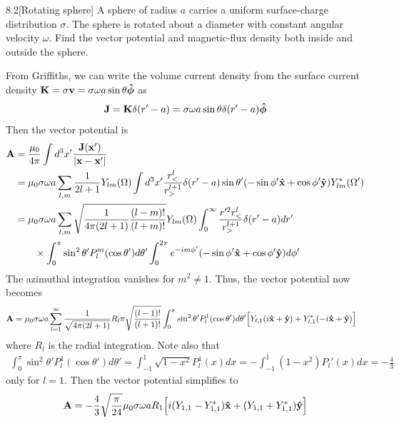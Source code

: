 \documentclass[12pt]{article}
\begin{document}
\begin{problem}{8.2}[Rotating sphere]
A sphere of radius $a$ carries a uniform surface-charge distribution $\sigma$.
The sphere is rotated about a diameter with constant angular velocity $\omega$.
Find the vector potential and magnetic-flux density both inside and outside the
sphere.
\begin{solution}
From Griffiths, we can write the volume current density from the surface current
density $\vb{K}=\sigma\vb{v}=\sigma\omega a\sin\theta\bm{\hat{\phi}}$ as
\begin{equation}
    \vb{J}=\vb{K}\delta(r'-a) 
    =\sigma\omega a\sin\theta\delta(r'-a)\bm{\hat{\phi}}
\end{equation}
Then the vector potential is
\begin{align}
    \vb{A}
    &=\frac{\mu_0}{4\pi}\int
    d^3x'\frac{\vb{J}(\vb{x}')}{\abs{\vb{x}-\vb{x}'}}\notag\\
    &=\mu_0\sigma\omega a\sum_{l,m}\frac1{2l+1}Y_{lm}(\Omega)\int d^3x'
    \frac{r_<^l}{r_>^{l+1}}
    \delta(r'-a)\sin\theta'(-\sin\phi'\vb{\hat{x}}+\cos\phi'\vb{\hat{y}})
    Y_{lm}^\ast(\Omega')\notag\\
    &=\mu_0\sigma\omega
    a\sum_{l,m}\sqrt{\frac{1}{4\pi(2l+1)}\frac{(l-m)!}{(l+m)!}}Y_{lm}(\Omega)
    \int_0^\infty \frac{r'^2r_<^l}{r_>^{l+1}}\delta(r'-a)dr'\notag\\
    &\qquad\times\int_0^\pi\sin^2\theta'P_l^m(\cos\theta')d\theta'
        \int_0^{2\pi}e^{-im\phi'}(-\sin\phi'\vb{\hat{x}}+\cos\phi'\vb{\hat{y}})d\phi'
\end{align}
The azimuthal integration vanishes for $m^2\neq 1$. Thus, the vector potential
now becomes
\begin{align}
    \vb{A}
    &=\mu_0\sigma\omega a\sum_{l=1}^\infty
    \frac{1}{\sqrt{4\pi(2l+1)}}R_l\pi\sqrt{\frac{(l-1)!}{(l+1)!}}
    \int_0^\pi\sin^2\theta'P_l^1(\cos\theta')d\theta'
\qty[Y_{l,1}(i\vb{\hat{x}}+\vb{\hat{y}})+Y_{l,1}^\ast(-i\vb{\hat{x}}+\vb{\hat{y}})]
\end{align}
where $R_l$ is the radial integration. Note also that
\begin{align}
    \int_0^\pi\sin^2\theta'P_l^1(\cos\theta')d\theta'
    =\int_{-1}^1\sqrt{1-x^2}P_l^1(x)dx
    =-\int_{-1}^1(1-x^2)P_l'(x)dx
    =-\frac43
\end{align}
only for $l=1$. Then the vector potential simplifies to
\begin{align}
    \vb{A}
    &=-\frac43\sqrt{\frac{\pi}{24}}\mu_0\sigma\omega
    aR_1\qty[i(Y_{1,1}-Y_{1,1}^\ast)\xhat+(Y_{1,1}+Y_{1,1}^\ast)\yhat]\notag\\

\end{align}
\end{solution}
\end{problem}
\end{document}
